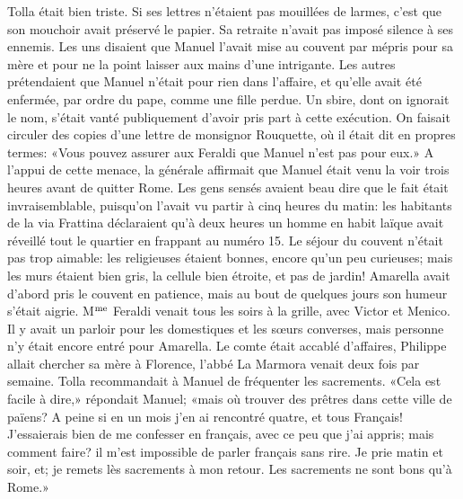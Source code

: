 Tolla était bien triste. Si ses lettres n'étaient pas mouillées de larmes, c'est que son mouchoir avait préservé le papier. Sa retraite n'avait pas imposé silence à ses ennemis. Les uns disaient que Manuel l'avait mise au couvent par mépris pour sa mère et pour ne la point laisser aux mains d'une intrigante. Les autres prétendaient que Manuel n'était pour rien dans l'affaire, et qu'elle avait été enfermée, par ordre du pape, comme une fille perdue. Un sbire, dont on ignorait le nom, s'était vanté publiquement d'avoir pris part à cette exécution. On faisait circuler des copies d'une lettre de monsignor Rouquette, où il était dit en propres termes: «Vous pouvez assurer aux Feraldi que Manuel n'est pas pour eux.» A l'appui de cette menace, la générale affirmait que Manuel était venu la voir trois heures avant de quitter Rome. Les gens sensés avaient beau dire que le fait était invraisemblable, puisqu'on l'avait vu partir à cinq heures du matin: les habitants de la via Frattina déclaraient qu'à deux heures un homme en habit laïque avait réveillé tout le quartier en frappant au numéro 15. Le séjour du couvent n'était pas trop aimable: les religieuses étaient bonnes, encore qu'un peu curieuses; mais les murs étaient bien gris, la cellule bien étroite, et pas de jardin! Amarella avait d'abord pris le couvent en patience, mais au bout de quelques jours son humeur s'était aigrie. M$\textsuperscript{me}$ Feraldi venait tous les soirs à la grille, avec Victor et Menico. Il y avait un parloir pour les domestiques et les s\oe{}urs converses, mais personne n'y était encore entré pour Amarella. Le comte était accablé d'affaires, Philippe allait chercher sa mère à Florence, l'abbé La Marmora venait deux fois par semaine. Tolla recommandait à Manuel de fréquenter les sacrements. «Cela est facile à dire,» répondait Manuel; «mais où trouver des prêtres dans cette ville de païens? A peine si en un mois j'en ai rencontré quatre, et tous Français! J'essaierais bien de me confesser en français, avec ce peu que j'ai appris; mais comment faire? il m'est impossible de parler français sans rire. Je prie matin et soir, et; je remets lès sacrements à mon retour. Les sacrements ne sont bons qu'à Rome.»

